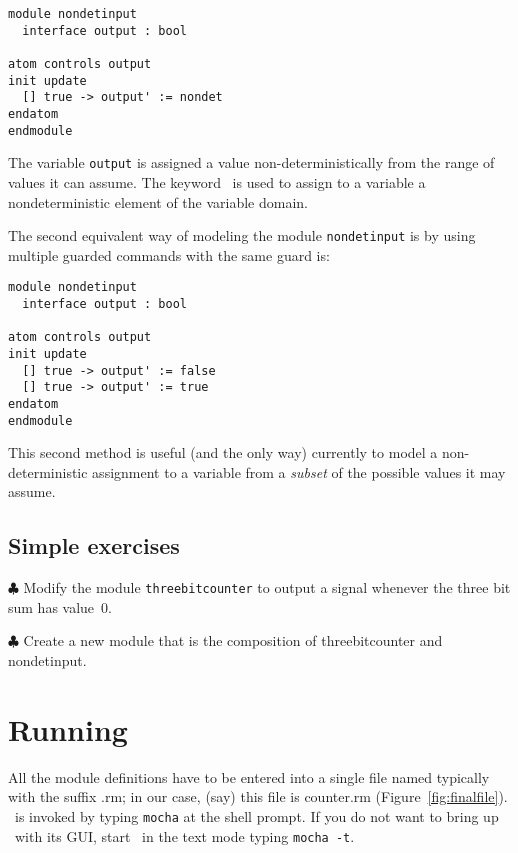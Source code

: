 \begin{verbatim}
module nondetinput
  interface output : bool

atom controls output
init update
  [] true -> output' := nondet
endatom 
endmodule 
\end{verbatim}

The variable {\tt output} is assigned a value non-deterministically from the
range of values it can assume. 
The keyword \NONDET\ is used to assign to a variable a
nondeterministic element of the variable domain.

The second equivalent way of modeling the module {\tt nondetinput} is by using multiple
guarded commands with the same guard is:

\begin{verbatim}
module nondetinput
  interface output : bool

atom controls output
init update
  [] true -> output' := false
  [] true -> output' := true
endatom 
endmodule 
\end{verbatim}

This second method is useful (and the only way) currently to model a
non-deterministic assignment to a variable from a {\em subset} of the
possible values it may assume. 

\subsection{Simple exercises}
$\clubsuit$ Modify the module {\tt threebitcounter} to output a signal
whenever the three bit sum has value~$0$. 

\noindent
$\clubsuit$ Create a new
module that is the composition of threebitcounter and nondetinput. 

\section{Running \mocha}
All the module definitions have to be entered into a single file named
typically with the suffix .rm; in our case, (say) this file is
counter.rm (Figure~\ref{fig:finalfile}). \mocha\ is invoked by typing {\tt mocha} at the shell
prompt. If you do not want to bring up \mocha\ with its GUI, start
\mocha\ in the text mode typing {\tt mocha -t}.


